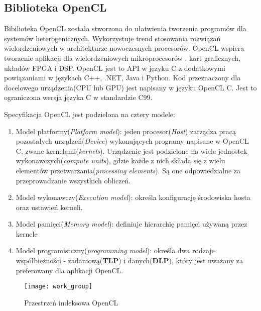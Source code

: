\documentclass[document.tex]{subfiles}
\begin{document}
\subsection{Biblioteka OpenCL}

\indent Bibilioteka OpenCL została stworzona do ułatwienia tworzenia programów dla systemów heterogenicznych. Wykorzystuje trend stosowania rozwiązań wielordzeniowych  w architekturze nowoczesnych procesorów. OpenCL wspiera tworzenie aplikacji dla wielordzeniowych mikroprocesorów , kart graficznych, układów FPGA i DSP.\cite{OpenCL_Gaster}
OpenCL jest to API w języku C z dodatkowymi powiązaniami w językach C++, .NET, Java i Python. Kod przeznaczony dla docelowego urządzenia(CPU lub GPU) jest napisany w języku OpenCL C. Jest to ograniczona wersja języka C w standardzie C99.

\indent Specyfikacja OpenCL jest podzielona na cztery modele\cite{OpenCL_Gaster}\cite{OpenCL_spec}\cite{OpenCL_Banger}:
\begin{enumerate}
\item Model platformy(\textit{Platform model}):
jeden procesor(\textit{Host}) zarządza pracą pozostałych urządzeń(\textit{Device}) wykonujących programy napisane w OpenCL C, zwane kernelami(\textit{kernels}).
Urządzenie jest podzielone na wiele jednostek wykonawczych(\textit{compute units}), gdzie każde z nich składa się z wielu elementów przetwarzania(\textit{processing elements}). Są one odpowiedzialne za przeprowadzanie wszystkich obliczeń.
\item Model wykonawczy(\textit{Execution model}): określa konfigurację środowiska hosta oraz ustawień kerneli.
\item Model pamięci(\textit{Memory model}): definiuje hierarchię pamięci używaną przez kernele
\item Model programistczny(\textit{programming model}): 
określa dwa rodzaje współbieżności - zadaniową(\textbf{TLP}) i danych(\textbf{DLP}), który jest uważany za preferowany dla aplikacji OpenCL.

\end{enumerate}

\begin{figure}[h]
\texttt{[image: work\_group]}
\caption{Przestrzeń indeksowa OpenCL \protect\cite{OpenCL_spec}}
\label{fig:work_group}
\end{figure}
\end{document}
